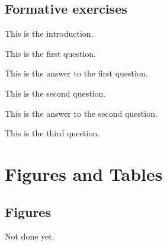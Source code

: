 \documentclass{camel}
\begin{document}
\section{Formative exercises}
\begin{formative}\label{fex:demo}
This is the introduction.
\begin{questions}
\question This is the first question.\label{qu:fex:demo:first-question}
\begin{answer}
This is the answer to the first question.
\end{answer}
\question This is the second question.\label{qu:fex:demo:second-question}
\begin{answer}
This is the answer to the second question.
\end{answer}
\question This is the third question.\label{qu:fex:demo:third-question}
\end{questions}
\end{formative}

\chapter{Figures and Tables}\label{ch:figsures_and_tables}

\section{Figures}\label{sec:figures}
Not done yet.
\end{document}
